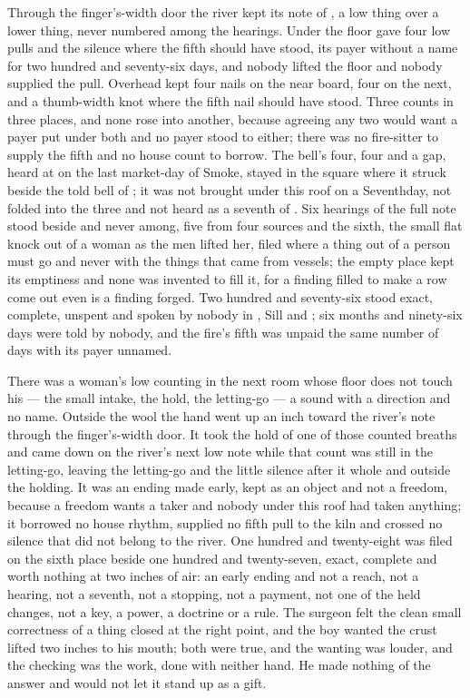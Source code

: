 Through the finger's-width door the river kept its note of , a low thing over a lower thing, never numbered among the hearings. Under the floor  gave four low pulls and the silence where the fifth should have stood, its payer without a name for two hundred and seventy-six days, and nobody lifted the floor and nobody supplied the pull. Overhead  kept four nails on the near board, four on the next, and a thumb-width knot where the fifth nail should have stood. Three counts in three places, and none rose into another, because agreeing any two would want a payer put under both and no payer stood to either; there was no fire-sitter to supply the fifth and no house count to borrow. The bell's four, four and a gap, heard at  on the last market-day of Smoke, stayed in the square where it struck beside the told bell of ; it was not brought under this roof on a Seventhday, not folded into the three and not heard as a seventh of . Six hearings of the full note stood beside and never among, five from four sources and the sixth, the small flat knock out of a woman as the men lifted her, filed where a thing out of a person must go and never with the things that came from vessels; the empty place kept its emptiness and none was invented to fill it, for a finding filled to make a row come out even is a finding forged. Two hundred and seventy-six stood exact, complete, unspent and spoken by nobody in , Sill and ; six months and ninety-six days were told by nobody, and the fire's fifth was unpaid the same number of days with its payer unnamed.

\scenebreak

There was a woman's low counting in the next room whose floor does not touch his --- the small intake, the hold, the letting-go --- a sound with a direction and no name. Outside the wool the hand went up an inch toward the river's note through the finger's-width door. It took the hold of one of those counted breaths and came down on the river's next low note while that count was still in the letting-go, leaving the letting-go and the little silence after it whole and outside the holding. It was an ending made early, kept as an object and not a freedom, because a freedom wants a taker and nobody under this roof had taken anything; it borrowed no house rhythm, supplied no fifth pull to the kiln and crossed no silence that did not belong to the river. One hundred and twenty-eight was filed on the sixth place beside one hundred and twenty-seven, exact, complete and worth nothing at two inches of air: an early ending and not a reach, not a hearing, not a seventh, not a stopping, not a payment, not one of the held changes, not a key, a power, a doctrine or a rule. The surgeon felt the clean small correctness of a thing closed at the right point, and the boy wanted the crust lifted two inches to his mouth; both were true, and the wanting was louder, and the checking was the work, done with neither hand. He made nothing of the answer and would not let it stand up as a gift.

